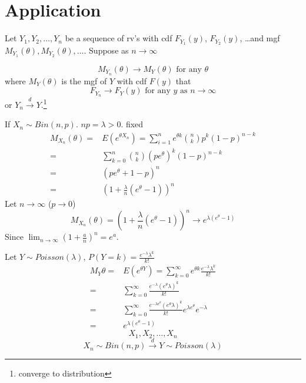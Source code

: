 \section{Application}
\begin{theo}
Let $Y_1,Y_2,\dots,Y_n$ be a sequence of rv's with cdf $F_{Y_1}(y)$, $F_{Y_2}(y)$, \dots and mgf $M_{Y_1}(\theta), M_{Y_2}(\theta),\dots $. Suppose as $n \to\infty$ 

\[M_{Y_n}(\theta) \rightarrow M_Y(\theta) \text{ for any }\theta\]
where $M_Y(\theta)$ is the mgf of $Y$ with cdf $F(y)$ that
\[F_{Y_n} \rightarrow F_Y(y) \text{ for any }y \text{ as }n \to \infty\]
or $Y_n\overset{d}{\longrightarrow} Y$.\footnote{converge to distribution}
\end{theo}

\begin{exmp}
If $X_n\sim Bin(n,p)$. $np=\lambda>0$. fixed
\begin{align*}
M_{X_n}(\theta)= & E(e^{\theta X_n}) =\sum_{i=1}^n e^{\theta k} {n \choose k} p^k (1-p)^{n-k}\\
= & \sum_{k=0}^n {n \choose k} (pe^{\theta})^k (1-p)^{n-k} \\
= & (pe^{\theta}+1-p)^n \\
= & \left(1+\frac{\lambda}{n}(e^{\theta}-1)\right)^n 
\end{align*}
Let $n \to \infty$ ($p\to 0$)
\[M_{X_n}(\theta)=  \left(1+\frac{\lambda}{n}(e^{\theta}-1)\right)^n \longrightarrow e^{\lambda(e^{\theta}-1)}\]
Since $\lim_{n\to \infty}\left(1+\frac{a}{n}\right)^n=e^a$.

Let $Y \sim Poisson(\lambda)$, $P(Y=k)=\frac{e^{-\lambda}\lambda^k}{k!}$
\begin{align*}
M_Y{\theta}= & E(e^{\theta Y}) =\sum_{k=0}^{\infty} e^{\theta k} \frac{e^{-\lambda}\lambda^k}{k!} \\
= & \sum_{k=0}^{\infty} \frac{e^{-\lambda}(e^{\theta} \lambda)^k}{k!} \\
= &  \sum_{k=0}^{\infty} \frac{e^{-\lambda e^{\theta}}(e^{\theta} \lambda)^k}{k!}  e^{\lambda e^{\theta}} e^{-\lambda} \\
= & e^{\lambda (e^{\theta}-1)} 
\end{align*}
\[X_1, X_2,\dots,X_n\]
\[X_n \sim Bin(n,p) \overset{d}{\longrightarrow} Y\sim Poisson(\lambda)\]
\end{exmp}


